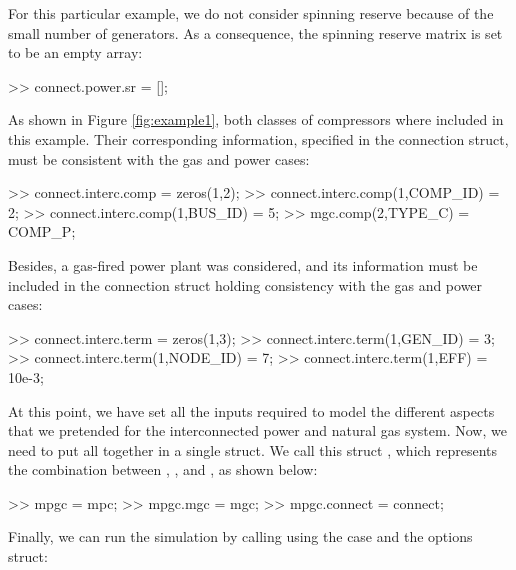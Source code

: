 For this particular example, we do not consider spinning reserve because of the small number of generators. As a consequence, the spinning reserve matrix is set to be an empty array:

\begin{Code}
>> connect.power.sr = [];                      %
\end{Code}

As shown in Figure \ref{fig:example1}, both classes of compressors where included in this example. Their corresponding information, specified in the connection struct, must be consistent with the gas and power cases:

\begin{Code}
>> connect.interc.comp = zeros(1,2); %
>> connect.interc.comp(1,COMP_ID) = 2;       %
>> connect.interc.comp(1,BUS_ID) = 5;        %
>> mgc.comp(2,TYPE_C) = COMP_P;              %
\end{Code}

Besides, a gas-fired power plant was considered, and its information must be included in the connection struct holding consistency with the gas and power cases:

\begin{Code}
>> connect.interc.term = zeros(1,3);       %
>> connect.interc.term(1,GEN_ID)  = 3;     %
>> connect.interc.term(1,NODE_ID) = 7;     %
>> connect.interc.term(1,EFF) = 10e-3;     %
\end{Code}

At this point, we have set all the inputs required to model the different aspects that we pretended for the interconnected power and natural gas system. Now, we need to put all together in a single struct. We call this struct , which represents the combination between , , and , as shown below:

\begin{Code}
>> mpgc = mpc;                         %
>> mpgc.mgc = mgc;                     %
>> mpgc.connect = connect;             %
\end{Code}

Finally, we can run the simulation by calling \mpng{} using the  case and the \matpower{} options struct:
 
